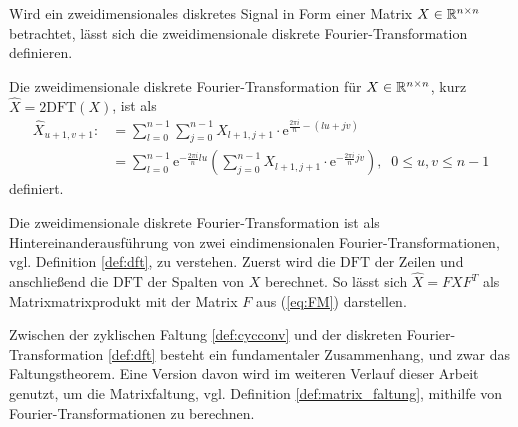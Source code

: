 Wird ein zweidimensionales diskretes Signal in Form einer Matrix $X \in \mathbb{R}^{n \times n}$ betrachtet, lässt sich die zweidimensionale diskrete Fourier-Transformation definieren. 
\begin{defi}
    Die zweidimensionale diskrete Fourier-Transformation für $X \in \mathbb{R}^{n \times n}$, kurz $\hat{X}=2\mathrm{DFT}(X)$, ist als
    \begin{align*}
        \hat{X}_{u+1,v+1}:&= \sum_{l=0}^{n-1} \sum_{j=0}^{n-1} X_{l+1,j+1} \cdot \mathrm{e}^{\frac{2 \pi i}{n} -(lu+jv)} \\
        &=\sum_{l=0}^{n-1} \mathrm{e}^{-\frac{2 \pi i}{n} l u} \left(\sum_{j=0}^{n-1} X_{l+1,j+1} \cdot \mathrm{e}^{-\frac{2 \pi i}{n} j v}\right), \; \; 0 \leq u, v \leq n-1
    \end{align*}
    definiert.
\end{defi}
Die zweidimensionale diskrete Fourier-Transformation ist als Hintereinanderausführung von zwei eindimensionalen Fourier-Transformationen, vgl. Definition \ref{def:dft}, zu verstehen. Zuerst wird die $\mathrm{DFT}$ der Zeilen und anschließend die $\mathrm{DFT}$ der Spalten von $X$ berechnet. So lässt sich $\hat{X}=FXF^T$ als Matrixmatrixprodukt mit der Matrix $F$ aus (\ref{eq:FM}) darstellen.

Zwischen der zyklischen Faltung \ref{def:cycconv} und der diskreten Fourier-Transformation \ref{def:dft} besteht ein fundamentaler Zusammenhang, und zwar das Faltungstheorem. Eine Version davon wird im weiteren Verlauf dieser Arbeit genutzt, um die Matrixfaltung, vgl. Definition \ref{def:matrix_faltung}, mithilfe von Fourier-Transformationen zu berechnen.

